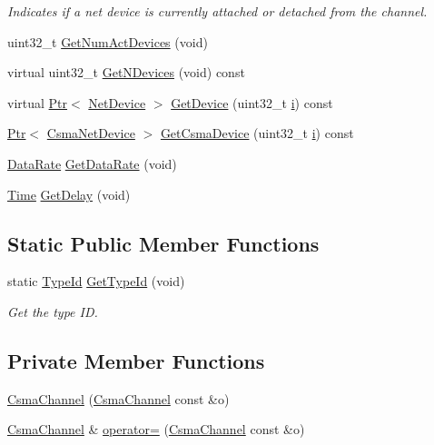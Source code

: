 \begin{DoxyCompactItemize}
\begin{DoxyCompactList}\small\item\em Indicates if a net device is currently attached or detached from the channel. \end{DoxyCompactList}\item 
uint32\+\_\+t \hyperlink{classns3_1_1CsmaChannel_a1909bdf3f85d4ad1f9562ebe57eb26df}{Get\+Num\+Act\+Devices} (void)
\item 
virtual uint32\+\_\+t \hyperlink{classns3_1_1CsmaChannel_af4d655eb4fa37f8619a3206bbd9eb07e}{Get\+N\+Devices} (void) const 
\item 
virtual \hyperlink{classns3_1_1Ptr}{Ptr}$<$ \hyperlink{classns3_1_1NetDevice}{Net\+Device} $>$ \hyperlink{classns3_1_1CsmaChannel_ae914c511d8ed7b6cc675103c208ee0b0}{Get\+Device} (uint32\+\_\+t \hyperlink{lte__uplink__power__control_8m_a6f6ccfcf58b31cb6412107d9d5281426}{i}) const 
\item 
\hyperlink{classns3_1_1Ptr}{Ptr}$<$ \hyperlink{classns3_1_1CsmaNetDevice}{Csma\+Net\+Device} $>$ \hyperlink{classns3_1_1CsmaChannel_a3d8a5c15b90586f0c34313a1f3471c37}{Get\+Csma\+Device} (uint32\+\_\+t \hyperlink{lte__uplink__power__control_8m_a6f6ccfcf58b31cb6412107d9d5281426}{i}) const 
\item 
\hyperlink{classns3_1_1DataRate}{Data\+Rate} \hyperlink{classns3_1_1CsmaChannel_a43579723e6e47f2530120af1edb5e5c4}{Get\+Data\+Rate} (void)
\item 
\hyperlink{classns3_1_1Time}{Time} \hyperlink{classns3_1_1CsmaChannel_a63ff5958e4f9e3de0c8cc12df764d2c9}{Get\+Delay} (void)
\end{DoxyCompactItemize}
\subsection*{Static Public Member Functions}
\begin{DoxyCompactItemize}
\item 
static \hyperlink{classns3_1_1TypeId}{Type\+Id} \hyperlink{classns3_1_1CsmaChannel_a58ca8d59505018b8a4bfe9288bbd2066}{Get\+Type\+Id} (void)
\begin{DoxyCompactList}\small\item\em Get the type ID. \end{DoxyCompactList}\end{DoxyCompactItemize}
\subsection*{Private Member Functions}
\begin{DoxyCompactItemize}
\item 
\hyperlink{classns3_1_1CsmaChannel_a2270a02fa453cb40947e50a3c9883190}{Csma\+Channel} (\hyperlink{classns3_1_1CsmaChannel}{Csma\+Channel} const \&o)
\item 
\hyperlink{classns3_1_1CsmaChannel}{Csma\+Channel} \& \hyperlink{classns3_1_1CsmaChannel_ae8628180d6aad85ecb8d0d84a1d3dde1}{operator=} (\hyperlink{classns3_1_1CsmaChannel}{Csma\+Channel} const \&o)
\end{DoxyCompactItemize}

